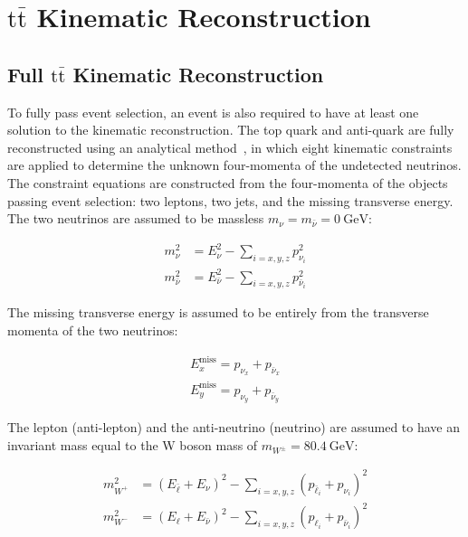 \section{\ensuremath{\mathrm{t\bar{t}}} Kinematic Reconstruction}

\subsection{Full \ensuremath{\mathrm{t\bar{t}}} Kinematic Reconstruction}
To fully pass event selection, an event is also required to have at least one solution to the \ttbar kinematic reconstruction.
The top quark and anti-quark are fully reconstructed using an analytical method~\cite{Sonnenschein:2006ud}, in which eight kinematic constraints are applied to determine the unknown four-momenta of the undetected neutrinos.
The constraint equations are constructed from the four-momenta of the objects passing event selection: two leptons, two jets, and the missing transverse energy. 
The two neutrinos are assumed to be massless $m_{\nu} = m_{\bar{\nu}} = \SI{0}{\GeV}$:
\begin{linenomath*}
\begin{align}
m_{\nu}^2 &= E_{\nu}^2 - \sum_{i = x, y, z} p_{\nu_i}^2 \\
m_{\bar{\nu}}^2 &= E_{\bar{\nu}}^2 - \sum_{i = x, y, z} p_{\bar{\nu}_i}^2
\end{align}
\end{linenomath*}
The missing transverse energy is assumed to be entirely from the transverse momenta of the two neutrinos:
\begin{linenomath*}
\begin{align}
E_{x}^{\text{miss}}=p_{\nu_x}+p_{\bar{\nu}_x} \\
E_{y}^{\text{miss}}=p_{\nu_y}+p_{\bar{\nu}_y}
\end{align}
\end{linenomath*}
The lepton (anti-lepton) and the anti-neutrino (neutrino) are assumed to have an invariant mass equal to the W boson mass of $m_{W^\pm} = \SI{80.4}{\GeV}$:
\begin{linenomath*}
\begin{align}
m_{W^{+}}^2 &=\left(E_{\bar{\ell}}+E_\nu\right)^2- \sum_{i = x, y, z} \left(p_{\bar{\ell}_i}+p_{\nu_i}\right)^2  \\
m_{W^{-}}^2 &=\left(E_{\ell}+E_{\bar{\nu}}\right)^2- \sum_{i = x, y, z} \left(p_{\ell_i}+p_{\bar{\nu}_i}\right)^2
\end{align}
\end{linenomath*}
